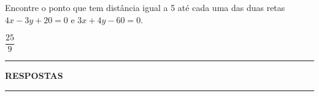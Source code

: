 \documentclass[12pt]{exam}
\begin{document}
\vspace{.3cm}

\questao{} Encontre o ponto que tem distância igual a 5 até cada uma das duas retas $4x - 3y + 20 = 0$ e $3x + 4y - 60 = 0$.

\begin{solucao}
    $\dfrac{25}{9}$
\end{solucao}

\vspace{.3cm}

\newpage
{}
\hrule
\begin{center}
    {\large\bf RESPOSTAS}
\end{center}
\hrule

\end{document}
